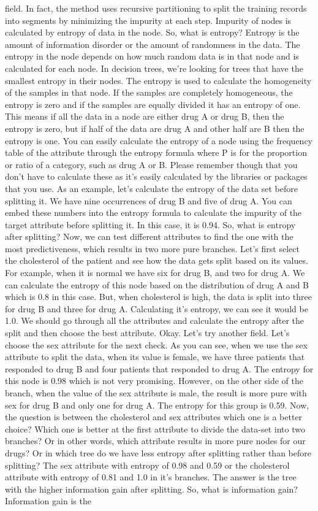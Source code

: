 field. In fact, the method uses recursive partitioning to split the training records into segments by minimizing the impurity at each step. Impurity of nodes is calculated by entropy of data in the node. So, what is entropy? Entropy is the amount of information disorder or the amount of randomness in the data. The entropy in the node depends on how much random data is in that node and is calculated for each node. In decision trees, we're looking for trees that have the smallest entropy in their nodes. The entropy is used to calculate the homogeneity of the samples in that node. If the samples are completely homogeneous, the entropy is zero and if the samples are equally divided it has an entropy of one. This means if all the data in a node are either drug A or drug B, then the entropy is zero, but if half of the data are drug A and other half are B then the entropy is one. You can easily calculate the entropy of a node using the frequency table of the attribute through the entropy formula where P is for the proportion or ratio of a category, such as drug A or B. Please remember though that you don't have to calculate these as it's easily calculated by the libraries or packages that you use. As an example, let's calculate the entropy of the data set before splitting it. We have nine occurrences of drug B and five of drug A. You can embed these numbers into the entropy formula to calculate the impurity of the target attribute before splitting it. In this case, it is 0.94. So, what is entropy after splitting? Now, we can test different attributes to find the one with the most predictiveness, which results in two more pure branches. Let's first select the cholesterol of the patient and see how the data gets split based on its values. For example, when it is normal we have six for drug B, and two for drug A. We can calculate the entropy of this node based on the distribution of drug A and B which is 0.8 in this case. But, when cholesterol is high, the data is split into three for drug B and three for drug A. Calculating it's entropy, we can see it would be 1.0. We should go through all the attributes and calculate the entropy after the split and then choose the best attribute. Okay. Let's try another field. Let's choose the sex attribute for the next check. As you can see, when we use the sex attribute to split the data, when its value is female, we have three patients that responded to drug B and four patients that responded to drug A. The entropy for this node is 0.98 which is not very promising. However, on the other side of the branch, when the value of the sex attribute is male, the result is more pure with sex for drug B and only one for drug A. The entropy for this group is 0.59. Now, the question is between the cholesterol and sex attributes which one is a better choice? Which one is better at the first attribute to divide the data-set into two branches? Or in other words, which attribute results in more pure nodes for our drugs? Or in which tree do we have less entropy after splitting rather than before splitting? The sex attribute with entropy of 0.98 and 0.59 or the cholesterol attribute with entropy of 0.81 and 1.0 in it's branches. The answer is the tree with the higher information gain after splitting. So, what is information gain? Information gain is the 